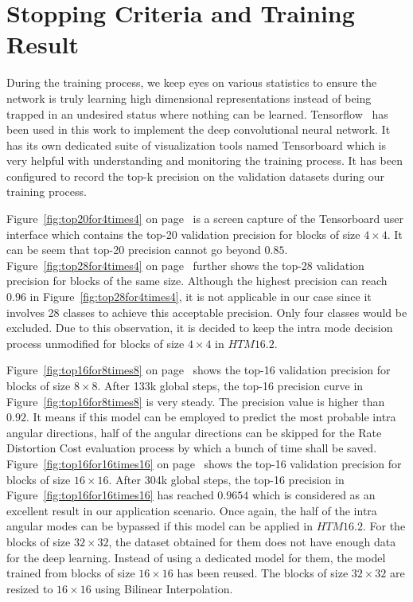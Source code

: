 \section{Stopping Criteria and Training Result}\label{sec:training}
During the training process, we keep eyes on 
various statistics to ensure the network is
truly learning high dimensional representations 
instead of being trapped
in an undesired status where nothing can be
learned.
Tensorflow~\parencite{tensorflow2015-whitepaper} has 
been used in this work to implement the 
deep convolutional neural network.
It has its own dedicated suite of visualization
tools named Tensorboard which is very helpful 
with understanding and monitoring the training process.
It has been configured to record the top-k precision
on the validation datasets during our training process.

Figure~\ref{fig:top20for4times4} 
on page~\pageref{fig:top20for4times4}
is a screen capture
of the Tensorboard user interface which contains the 
top-20 validation precision for blocks of size \(4\times4\).
It can be seem that top-20 precision cannot go 
beyond \(0.85\).
Figure~\ref{fig:top28for4times4}
on page~\pageref{fig:top28for4times4}
further shows the 
top-28 validation precision for blocks of the same size.
Although the highest precision can reach \(0.96\) 
in Figure~\ref{fig:top28for4times4}, it is not applicable
in our case since it involves 28 classes to achieve this 
acceptable precision.
Only four classes would be excluded.
Due to this observation, it is decided to
keep the intra mode decision process unmodified for 
blocks of size \(4\times4\) in \(HTM16.2\).

Figure~\ref{fig:top16for8times8}
on page~\pageref{fig:top16for8times8}
shows the 
top-16 validation precision for blocks of size \(8\times8\).
After 133k global steps, the top-16 precision curve in 
Figure~\ref{fig:top16for8times8} is very steady.
The precision value is higher than \(0.92\).
It means if this model can be employed to predict the 
most probable intra angular directions,
half of the angular directions can be skipped for
the Rate Distortion Cost evaluation process by which
a bunch of time shall be saved.
Figure~\ref{fig:top16for16times16} 
on page~\pageref{fig:top16for16times16}
shows the
top-16 validation precision for blocks 
of size \(16\times16\).
After 304k global steps, the top-16 precision in
Figure~\ref{fig:top16for16times16} has reached
\(0.9654\) which is considered as an excellent
result in our application scenario.
Once again, the half of the intra angular modes
can be bypassed if this model can be applied 
in \(HTM16.2\).
For the blocks of size \(32\times32\),
the dataset obtained for them does not 
have enough data
for the deep learning.
Instead of using a dedicated model for them,
the model trained from blocks of 
size \(16\times16\) has been reused.
The blocks of size \(32\times32\) are resized
to \(16\times16\) using Bilinear Interpolation.

